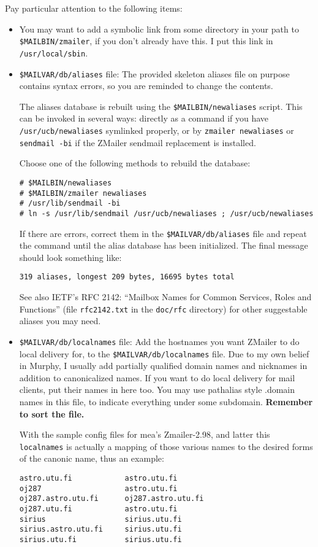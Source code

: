 Pay particular attention to the following items:
\begin{itemize}
\item You may want to add a symbolic link from some directory in your path
to {\tt \$MAILBIN/zmailer}, if you don't already have this.  I put this link
in {\tt /usr/local/sbin}.
\item {\tt \$MAILVAR/db/aliases} file:  The provided skeleton aliases file on purpose contains syntax errors,
so you are reminded to change the contents.

The aliases database is rebuilt using the {\tt \$MAILBIN/newaliases} script.
This can be invoked in several ways: directly as a command if you
have {\tt /usr/ucb/newaliases} symlinked properly, or by {\tt zmailer newaliases}
or {\tt sendmail -bi} if the ZMailer sendmail replacement is installed.

Choose one of the following methods to rebuild the database:
\begin{verbatim}
# $MAILBIN/newaliases
# $MAILBIN/zmailer newaliases
# /usr/lib/sendmail -bi
# ln -s /usr/lib/sendmail /usr/ucb/newaliases ; /usr/ucb/newaliases
\end{verbatim}

If there are errors, correct them in the {\tt \$MAILVAR/db/aliases} file
and repeat the command until the alias database has been initialized.
The final message should look something like:
\begin{verbatim}
319 aliases, longest 209 bytes, 16695 bytes total
\end{verbatim}

See also IETF's RFC 2142: ``Mailbox Names for Common Services, Roles and
Functions'' (file {\tt rfc2142.txt} in the {\tt doc/rfc} directory) 
for other suggestable aliases you may need. 
                                                               
\item {\tt \$MAILVAR/db/localnames} file: Add the hostnames you want ZMailer to do local delivery for, to the
{\tt \$MAILVAR/db/localnames} file.  Due to my own belief in Murphy,
I usually add partially qualified domain names and nicknames in
addition to canonicalized names.  If you want to do local delivery
for mail clients, put their names in here too.  You may use pathalias 
style .domain names in this file, to indicate everything under some
subdomain. {\bf Remember to sort the file.}

With the sample config files for mea's Zmailer-2.98, and latter
this {\tt localnames} is actually a mapping of those various names to
the desired forms of the canonic name, thus an example:
\begin{verbatim}
astro.utu.fi            astro.utu.fi
oj287                   astro.utu.fi
oj287.astro.utu.fi      oj287.astro.utu.fi
oj287.utu.fi            astro.utu.fi
sirius                  sirius.utu.fi
sirius.astro.utu.fi     sirius.utu.fi
sirius.utu.fi           sirius.utu.fi
\end{verbatim}


\end{itemize}

